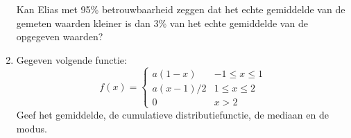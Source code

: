 \documentclass{article}
\begin{document}
\begin{enumerate}
\begin{tabular}{l | l | l | l | l}
  \end{tabular}
  
  Kan Elias met 95\% betrouwbaarheid zeggen dat het echte gemiddelde van de gemeten waarden kleiner is dan 3\% van het echte gemiddelde van de opgegeven waarden?

  
  \item Gegeven volgende functie:   $$f(x) = \begin{cases}
                                            a(1 - x)   & -1 \leq x \le 1 \\
                                            a(x - 1)/2 & 1 \leq x \leq 2 \\
                                            0          & x > 2
                                            
                                           \end{cases}
                                    $$
        Geef het gemiddelde, de cumulatieve distributiefunctie, de mediaan en de modus.
 \end{enumerate}
\end{document}
